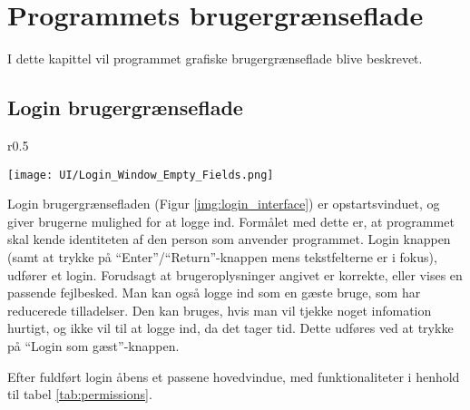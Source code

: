 \chapter{Programmets brugergrænseflade}
I dette kapittel vil programmet grafiske brugergrænseflade blive beskrevet.

\section{Login brugergrænseflade}
\begin{wrapfigure}{r}{0.5\textwidth}
    \label{img:login_interface}
    \vspace{-20pt}
    \begin{center}
        \texttt{[image: UI/Login\_Window\_Empty\_Fields.png]}
    \end{center}
    \vspace{-15pt}
    \caption{Login interface}
\end{wrapfigure}
Login brugergrænsefladen (Figur \ref{img:login_interface}) er opstartsvinduet, og giver brugerne mulighed for at logge ind.
Formålet med dette er, at programmet skal kende identiteten af den person som anvender programmet.
Login knappen (samt at trykke på ``Enter''/``Return''-knappen mens tekstfelterne er i fokus), udfører et login. 
Forudsagt at brugeroplysninger angivet er korrekte, eller vises en passende fejlbesked.
Man kan også logge ind som en gæste bruge, som har reducerede tilladelser. 
Den kan bruges, hvis man vil tjekke noget infomation hurtigt, og ikke vil til at logge ind, da det tager tid.
Dette udføres ved at trykke på ``Login som gæst''-knappen. 

Efter fuldført login åbens et passene hovedvindue, med funktionaliteter i henhold til tabel \ref{tab:permissions}.

